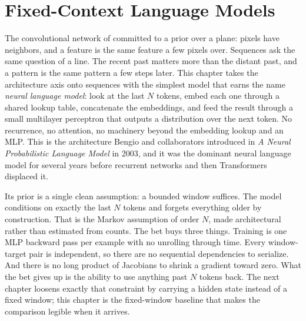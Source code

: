 
\chapter[Fixed-Context Language Models]{Fixed-Context Language Models}%
\label{ch:fixed-context-lm}

The convolutional network of  committed to a prior over a
plane: pixels have neighbors, and a feature is the same feature a few
pixels over. Sequences ask the same question of a line. The recent past
matters more than the distant past, and a pattern is the same pattern a
few steps later. This chapter takes the architecture axis onto sequences
with the simplest model that earns the name \emph{neural language model}:
look at the last $N$ tokens, embed each one through a shared lookup table,
concatenate the embeddings, and feed the result through a small multilayer
perceptron that outputs a distribution over the next token. No recurrence,
no attention, no machinery beyond the embedding lookup and an
 MLP. This is the architecture Bengio and
collaborators introduced in \emph{A Neural Probabilistic Language Model}
in 2003, and it was the dominant neural language model for several years
before recurrent networks and then Transformers displaced it.

Its prior is a single clean assumption: a bounded window suffices. The
model conditions on exactly the last $N$ tokens and forgets everything
older by construction. That is the Markov assumption of order $N$, made
architectural rather than estimated from counts. The bet buys three
things. Training is one MLP backward pass per example with no unrolling
through time. Every window-target pair is independent, so there are no
sequential dependencies to serialize. And there is no long product of
Jacobians to shrink a gradient toward zero. What the bet gives up is the
ability to use anything past $N$ tokens back. The next chapter loosens
exactly that constraint by carrying a hidden state instead of a fixed
window; this chapter is the fixed-window baseline that makes the
comparison legible when it arrives.

